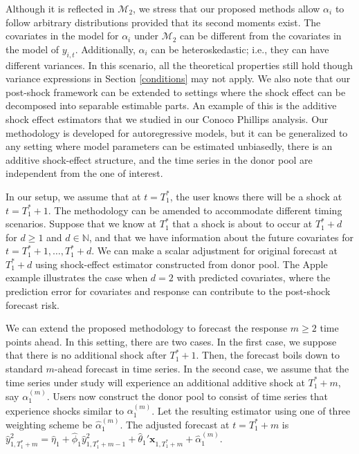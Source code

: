 \documentclass[11pt,3p,review,authoryear]{elsarticle}
\def\mc#1{\mathcal{#1}} %
\theoremstyle{definition}
\begin{document}
Although it is reflected in $\mc{M}_2$, we stress that our proposed methods allow $\alpha_i$ to follow arbitrary distributions provided that its second moments exist. The covariates in the model for $\alpha_i$ under $\mc{M}_2$ can be different from the covariates in the model of $y_{i,t}$.  Additionally, $\alpha_i$ can be heteroskedastic; i.e.,  they can have different variances. In this scenario, all the theoretical properties still hold though variance expressions in Section \ref{conditions} may not apply. We also note that our post-shock framework can be extended to settings where the shock effect can be decomposed into separable estimable parts. An example of this is the additive shock effect estimators that we studied in our Conoco Phillips analysis. Our methodology is developed for autoregressive models, but it can be generalized to any setting  where model parameters can be estimated unbiasedly, there is an additive shock-effect structure, and the time series in the donor pool are independent from the one of interest.

In our setup, we assume that at $t=T_1^*$, the user knows there will be a shock at $t=T_1^*+1$. The methodology can be amended to accommodate different timing scenarios. Suppose that we know at $T_1^*$ that a shock is about to occur at $T_1^* + d$ for $d\geq 1$ and $d\in \mathbb{N}$, and that we have information about the future covariates for $t = T_1^* +1 , \ldots, T_1^* + d$. We can make a scalar adjustment for original forecast at $T_1^*+d$ using shock-effect estimator constructed from donor pool. The Apple example illustrates the case when $d = 2$ with predicted covariates, where the prediction error for covariates and response can contribute to the post-shock forecast risk.


We can extend the proposed methodology to forecast the response $m\geq 2$ time points ahead. %
In this setting, there are two cases. In the first case, we suppose that there is no additional shock after $T_1^*+1$. Then, the forecast boils down to standard $m$-ahead forecast in time series. In the second case, we assume that the time series under study will experience an additional additive shock at $T_1^* + m$, say $\alpha_1^{(m)}$. Users now construct the donor pool to consist of time series that experience shocks similar to  $\alpha_1^{(m)}$. Let the resulting estimator using one of  three weighting scheme be $\hat{\alpha}_1^{(m)}$.  The adjusted forecast at $t = T_1^* + m$ is
$
  \hat{y}^2_{1, T_1^*+m}=\hat{\eta}_1 + \hat{\phi}_1 \hat{y}_{1, T_1^* + m - 1}^2 + \hat{\theta}_1' \mathbf{x}_{1, T_1^* +m} + \hat{\alpha}_1^{(m)}.
$
\end{document}
